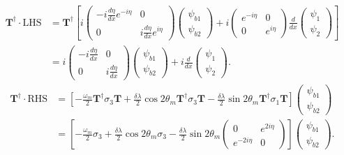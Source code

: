 \documentclass[letterpaper,12pt,english]{sphinxmanual}
\begin{document}
\begin{equation*}
\begin{split}\mathbf{T}^\dagger \cdot \mathrm{LHS} &= \mathbf{T}^\dagger\left[ i \begin{pmatrix} - i \frac{d\eta}{dx} e^{-i\eta} & 0 \\ 0 & i \frac{d\eta}{dx} e^{i\eta} \end{pmatrix} \begin{pmatrix} \psi_{b1} \\ \psi_{b2} \end{pmatrix} + i \begin{pmatrix}  e^{-i\eta} & 0 \\ 0 & e^{i\eta} \end{pmatrix} \frac{d}{dx} \begin{pmatrix} \psi_1 \\ \psi_2 \end{pmatrix} \right] \\
& =   i \begin{pmatrix} - i \frac{d\eta}{dx}  & 0 \\ 0 & i \frac{d\eta}{dx}  \end{pmatrix} \begin{pmatrix} \psi_{b1} \\ \psi_{b2} \end{pmatrix} + i \frac{d}{dx} \begin{pmatrix} \psi_1 \\ \psi_2 \end{pmatrix}  .\end{split}
\end{equation*}\begin{equation*}
\begin{split}\mathbf{T}^\dagger \cdot \mathrm{RHS} &= \left[ -\frac{\omega_m}{2} \mathbf{T} ^\dagger \sigma_3 \mathbf{T} + \frac{\delta \lambda}{2} \cos 2\theta_m \mathbf{T}^\dagger \sigma_3 \mathbf{T} - \frac{\delta \lambda}{2} \sin 2\theta_m \mathbf{T}^\dagger \sigma_1 \mathbf{T}   \right] \begin{pmatrix} \psi_{b1} \\ \psi_{b2} \end{pmatrix} \\
& =  \left[ -\frac{\omega_m}{2} \sigma_3  + \frac{\delta \lambda}{2} \cos 2\theta_m  \sigma_3  - \frac{\delta \lambda}{2} \sin 2\theta_m \begin{pmatrix} 0 & e^{2i\eta} \\ e^{-2 i\eta } & 0 \end{pmatrix}   \right] \begin{pmatrix} \psi_{b1} \\ \psi_{b2} \end{pmatrix} .\end{split}
\end{equation*}
\end{document}
